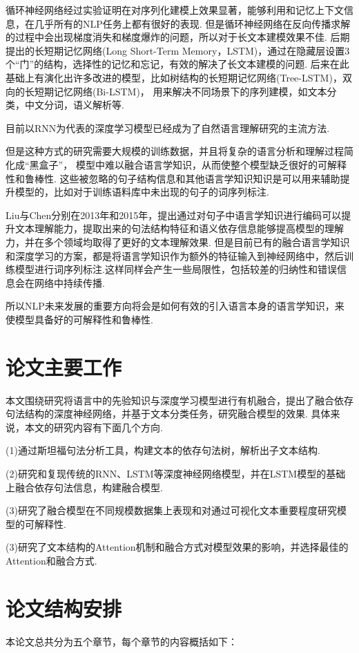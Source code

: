\documentclass[bachelor,adobefonts]{jnuthesis}
\begin{document}
循环神经网络经过实验证明在对序列化建模上效果显著，能够利用和记忆上下文信息，在几乎所有的NLP任务上都有很好的表现.
但是循环神经网络在反向传播求解的过程中会出现梯度消失和梯度爆炸的问题，所以对于长文本建模效果不佳.
后期提出的长短期记忆网络\cite{Graves2012Long}(Long Short-Term Memory，LSTM)，通过在隐藏层设置3个“门”的结构，选择性的记忆和忘记，有效的解决了长文本建模的问题.
后来在此基础上有演化出许多改进的模型，比如树结构的长短期记忆网络\cite{Tai2015Improved}(Tree-LSTM)，双向的长短期记忆网络\cite{Bahdanau2014Neural}(Bi-LSTM)，
用来解决不同场景下的序列建模，如文本分类，中文分词，语义解析等.

目前以RNN为代表的深度学习模型已经成为了自然语言理解研究的主流方法.

但是这种方式的研究需要大规模的训练数据，并且将复杂的语言分析和理解过程简化成“黑盒子”，
模型中难以融合语言学知识，从而使整个模型缺乏很好的可解释性和鲁棒性.
这些被忽略的句子结构信息和其他语言学知识知识是可以用来辅助提升模型的，比如对于训练语料库中未出现的句子的词序列标注\cite{Deoras2013Deep}.

Liu与Chen分别在2013年\cite{Liu2014Query}和2015年\cite{Chen2015Matrix}，提出通过对句子中语言学知识进行编码可以提升文本理解能力，提取出来的句法结构特征和语义依存信息能够提高模型的理解力，并在多个领域均取得了更好的文本理解效果.
但是目前已有的融合语言学知识和深度学习的方案，都是将语言学知识作为额外的特征输入到神经网络中，然后训练模型进行词序列标注.这样同样会产生一些局限性，包括较差的归纳性和错误信息会在网络中持续传播.

所以NLP未来发展的重要方向将会是如何有效的引入语言本身的语言学知识，来使模型具备好的可解释性和鲁棒性.

\section{论文主要工作}
本文围绕研究将语言中的先验知识与深度学习模型进行有机融合，提出了融合依存句法结构的深度神经网络，并基于文本分类任务，研究融合模型的效果.
具体来说，本文的研究内容有下面几个方向.

(1)通过斯坦福句法分析工具，构建文本的依存句法树，解析出子文本结构.

(2)研究和复现传统的RNN、LSTM等深度神经网络模型，并在LSTM模型的基础上融合依存句法信息，构建融合模型.

(3)研究了融合模型在不同规模数据集上表现和对通过可视化文本重要程度研究模型的可解释性.

(3)研究了文本结构的Attention机制和融合方式对模型效果的影响，并选择最佳的Attention和融合方式.

\section{论文结构安排}
本论文总共分为五个章节，每个章节的内容概括如下：
\end{document}
